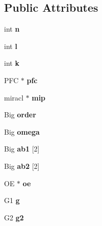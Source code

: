 \subsection*{Public Attributes}
\begin{DoxyCompactItemize}
\item 
\hypertarget{classAOE_ad58be8b79a382b9ff24ae3e7c784c568}{int {\bfseries n}}\label{classAOE_ad58be8b79a382b9ff24ae3e7c784c568}

\item 
\hypertarget{classAOE_ac3d9eb7e853fe95c1ddc489ef7d21915}{int {\bfseries l}}\label{classAOE_ac3d9eb7e853fe95c1ddc489ef7d21915}

\item 
\hypertarget{classAOE_ac1da0894513c47f77a7096bf0f982e05}{int {\bfseries k}}\label{classAOE_ac1da0894513c47f77a7096bf0f982e05}

\item 
\hypertarget{classAOE_aa6b38b90c0de109ac06699808284b643}{P\-F\-C $\ast$ {\bfseries pfc}}\label{classAOE_aa6b38b90c0de109ac06699808284b643}

\item 
\hypertarget{classAOE_a65159f980bccc5b21da05c154cb8c3d0}{miracl $\ast$ {\bfseries mip}}\label{classAOE_a65159f980bccc5b21da05c154cb8c3d0}

\item 
\hypertarget{classAOE_abb473de4ed8d8294e5bb5bc4d26ade92}{Big {\bfseries order}}\label{classAOE_abb473de4ed8d8294e5bb5bc4d26ade92}

\item 
\hypertarget{classAOE_a5bcf01ddc1f7a6962c391d60bed61975}{Big {\bfseries omega}}\label{classAOE_a5bcf01ddc1f7a6962c391d60bed61975}

\item 
\hypertarget{classAOE_ab7aba1ddc9db5600ba8c6865abce6701}{Big {\bfseries ab1} \mbox{[}2\mbox{]}}\label{classAOE_ab7aba1ddc9db5600ba8c6865abce6701}

\item 
\hypertarget{classAOE_a01feefdc255058f8437cf337dbe1e887}{Big {\bfseries ab2} \mbox{[}2\mbox{]}}\label{classAOE_a01feefdc255058f8437cf337dbe1e887}

\item 
\hypertarget{classAOE_a428ebbb7d1a17a6cef428103345f2b36}{O\-E $\ast$ {\bfseries oe}}\label{classAOE_a428ebbb7d1a17a6cef428103345f2b36}

\item 
\hypertarget{classAOE_a47a57d1c8f9a511317433527a49b1af5}{G1 {\bfseries g}}\label{classAOE_a47a57d1c8f9a511317433527a49b1af5}

\item 
\hypertarget{classAOE_aefc9e7587dca527afbfac4c322b1c996}{G2 {\bfseries g2}}\label{classAOE_aefc9e7587dca527afbfac4c322b1c996}

\end{DoxyCompactItemize}


